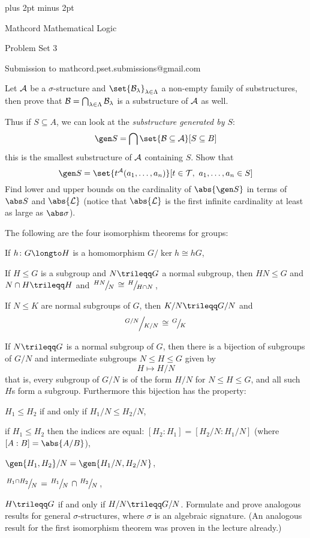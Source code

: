 

\parindent=0pt
\parskip=3pt plus 2pt minus 2pt



\centerline{Mathcord Mathematical Logic}
\centerline{Problem Set 3}
\centerline{Submission to mathcord.pset.submissions@gmail.com}

\bprob

    Let ${\cal A}$ be a $\sigma$-structure and $\set{\c B_\lambda}_{\lambda\in\Lambda}$ a non-empty family of substructures,
    then prove that ${\cal B}=\bigcap_{\lambda\in\Lambda}{\cal B}_\lambda$ is a substructure of ${\cal A}$ as well.

    Thus if $S\subseteq A$, we can look at the {\it substructure generated by $S$}:
    $$ \gen S = \bigcap\set{\c B\subseteq\c A}[S\subseteq B] $$
    this is the smallest substructure of ${\cal A}$ containing $S$.
    Show that
    $$ \gen S = \set{t^{\c A}(a_1,\dots,a_n)}[t\in\c T,\ a_1,\dots,a_n\in S] $$
    Find lower and upper bounds on the cardinality of $\abs{\gen S}$ in terms of $\abs S$ and $\abs{\c L}$ (notice that $\abs{\c L}$ is the first infinite cardinality at least as large as $\abs\sigma$).
    
\eprob

\bprob

    The following are the four isomorphism theorems for groups:
    \benum
        \item If $h\colon G\longto H$ is a homomorphism $G/\ker h\cong hG$,
        \item If $H\leq G$ is a subgroup and $N\trileqq G$ a normal subgroup, then $HN\leq G$ and $N\cap H\trileqq H$ and $\slfrac{HN}N\cong\slfrac H{H\cap N}$,
        \item If $N\leq K$ are normal subgroups of $G$, then $K/N\trileqq G/N$ and
        $$ \slfrac{G/N}{K/N} \cong \slfrac GK $$
        \item If $N\trileqq G$ is a normal subgroup of $G$, then there is a bijection of subgroups of $G/N$ and intermediate subgroups $N\leq H\leq G$ given by
        $$ H \mapsto H/N $$
        that is, every subgroup of $G/N$ is of the form $H/N$ for $N\leq H\leq G$, and all such $H$s form a subgroup.
        Furthermore this bijection has the property:
        \benum
            \item $H_1\leq H_2$ if and only if $H_1/N\leq H_2/N$,
            \item if $H_1\leq H_2$ then the indices are equal: $[H_2:H_1]=[H_2/N:H_1/N]$ (where $[A:B]=\abs{A/B}$),
            \item $\gen{H_1,H_2}/N=\gen{H_1/N,H_2/N}$,
            \item $\slfrac{H_1\cap H_2}N=\slfrac{H_1}N\cap\slfrac{H_2}N$,
            \item $H\trileqq G$ if and only if $H/N\trileqq G/N$.
        \eenum
    \eenum
    Formulate and prove analogous results for general $\sigma$-structures, where $\sigma$ is an algebraic signature.
    (An analogous result for the first isomorphism theorem was proven in the lecture already.)

